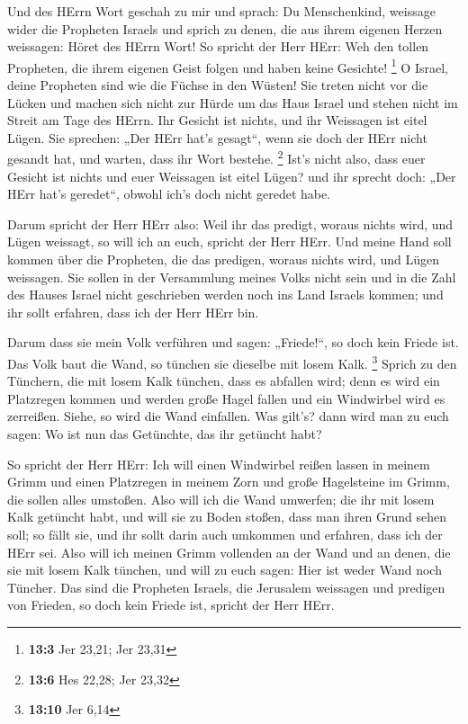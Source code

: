  Und des HErrn Wort geschah zu mir und sprach:
 Du Menschenkind, weissage wider die Propheten Israels und
sprich zu denen, die aus ihrem eigenen Herzen weissagen: Höret des HErrn
Wort!  So spricht der Herr HErr: Weh den tollen Propheten,
die ihrem eigenen Geist folgen und haben keine Gesichte! \footnote{\textbf{13:3}
  Jer 23,21; Jer 23,31}  O Israel, deine Propheten sind
wie die Füchse in den Wüsten!  Sie treten nicht vor die
Lücken und machen sich nicht zur Hürde um das Haus Israel und stehen
nicht im Streit am Tage des HErrn.  Ihr Gesicht ist
nichts, und ihr Weissagen ist eitel Lügen. Sie sprechen: „Der HErr hat's
gesagt``, wenn sie doch der HErr nicht gesandt hat, und warten, dass ihr
Wort bestehe. \footnote{\textbf{13:6} Hes 22,28; Jer 23,32}
 Ist's nicht also, dass euer Gesicht ist nichts und euer
Weissagen ist eitel Lügen? und ihr sprecht doch: „Der HErr hat's
geredet``, obwohl ich's doch nicht geredet habe.

 Darum spricht der Herr HErr also: Weil ihr das predigt,
woraus nichts wird, und Lügen weissagt, so will ich an euch, spricht der
Herr HErr.  Und meine Hand soll kommen über die Propheten,
die das predigen, woraus nichts wird, und Lügen weissagen. Sie sollen in
der Versammlung meines Volks nicht sein und in die Zahl des Hauses
Israel nicht geschrieben werden noch ins Land Israels kommen; und ihr
sollt erfahren, dass ich der Herr HErr bin.

 Darum dass sie mein Volk verführen und sagen:
„Friede!{}``, so doch kein Friede ist. Das Volk baut die Wand, so
tünchen sie dieselbe mit losem Kalk. \footnote{\textbf{13:10} Jer 6,14}
 Sprich zu den Tünchern, die mit losem Kalk tünchen, dass
es abfallen wird; denn es wird ein Platzregen kommen und werden große
Hagel fallen und ein Windwirbel wird es zerreißen. 
Siehe, so wird die Wand einfallen. Was gilt's? dann wird man zu euch
sagen: Wo ist nun das Getünchte, das ihr getüncht habt?

 So spricht der Herr HErr: Ich will einen Windwirbel
reißen lassen in meinem Grimm und einen Platzregen in meinem Zorn und
große Hagelsteine im Grimm, die sollen alles umstoßen. 
Also will ich die Wand umwerfen; die ihr mit losem Kalk getüncht habt,
und will sie zu Boden stoßen, dass man ihren Grund sehen soll; so fällt
sie, und ihr sollt darin auch umkommen und erfahren, dass ich der HErr
sei.  Also will ich meinen Grimm vollenden an der Wand
und an denen, die sie mit losem Kalk tünchen, und will zu euch sagen:
Hier ist weder Wand noch Tüncher.  Das sind die Propheten
Israels, die Jerusalem weissagen und predigen von Frieden, so doch kein
Friede ist, spricht der Herr HErr.

